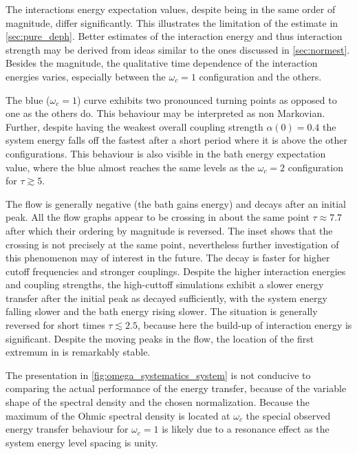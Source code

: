The interactions energy expectation values, despite being in the same
order of magnitude, differ significantly. This illustrates the
limitation of the estimate in \cref{sec:pure_deph}. Better estimates
of the interaction energy and thus interaction strength may be derived
from ideas similar to the ones discussed in
\cref{sec:normest}. Besides the magnitude, the qualitative time
dependence of the interaction energies varies, especially between the
\(ω_c=1\) configuration and the others.

The blue (\(ω_c=1\)) curve exhibits two pronounced turning points as
opposed to one as the others do. This behaviour may be interpreted as
non Markovian. Further, despite having the weakest overall coupling
strength \(α(0)=0.4\) the system energy falls off the fastest after a
short period where it is above the other configurations. This
behaviour is also visible in the bath energy expectation value, where
the blue almost reaches the same levels as the \(ω_c=2\) configuration
for \(τ\gtrsim 5\).

The flow is generally negative (the bath gains energy) and decays
after an initial peak. All the flow graphs appear to be crossing in
about the same point \(τ\approx 7.7\) after which their ordering by
magnitude is reversed.  The inset shows that the crossing is not
precisely at the same point, nevertheless further investigation of
this phenomenon may of interest in the future. The decay is
faster for higher cutoff frequencies and stronger couplings. Despite
the higher interaction energies and coupling strengths, the
high-cuttoff simulations exhibit a slower energy transfer after the
initial peak as decayed sufficiently, with the system energy falling
slower and the bath energy rising slower. The situation is generally
reversed for short times \(τ\lesssim 2.5\), because here the build-up
of interaction energy is significant. Despite the moving peaks in the
flow, the location of the first extremum in is remarkably stable.

The presentation in \cref{fig:omega_systematics_system} is not
conducive to comparing the actual performance of the energy transfer,
because of the variable shape of the spectral density and the chosen
normalization. Because the maximum of the Ohmic spectral density is
located at \(ω_c\) the special observed energy transfer behaviour for
\(ω_c=1\) is likely due to a resonance effect as the system energy
level spacing is unity.

